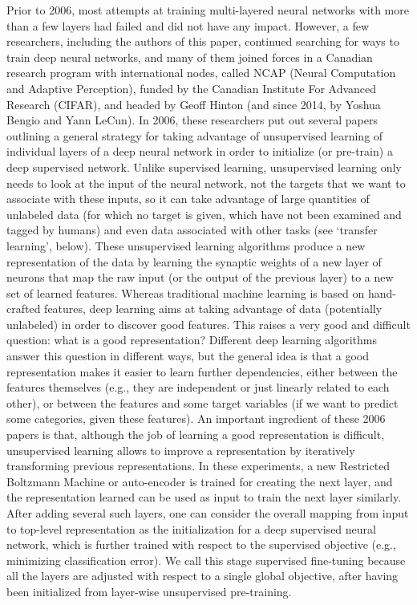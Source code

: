\documentclass[11pt]{article} %
\begin{document}
Prior to 2006, most attempts at training multi-layered neural networks with
more than a few layers had failed and did not have any impact. However, a
few researchers, including the authors of this paper, continued searching
for ways to train deep neural networks, and many of them joined forces in a
Canadian research program with international nodes, called NCAP (Neural
Computation and Adaptive Perception), funded by the Canadian Institute For
Advanced Research (CIFAR), and headed by Geoff Hinton (and since 2014, by
Yoshua Bengio and Yann LeCun). In 2006, these researchers put out several
papers~\citep{Hinton06, Bengio-nips-2006-small,ranzato-07-small} outlining a general strategy for taking advantage of
unsupervised learning of individual layers of a deep neural network in
order to initialize (or pre-train) a deep supervised network. Unlike
supervised learning, unsupervised learning only needs to look at the input
of the neural network, not the targets that we want to associate with these
inputs, so it can take advantage of large quantities of unlabeled data (for
which no target is given, which have not been examined and tagged by
humans) and even data associated with other tasks (see ‘transfer learning’,
below).  These unsupervised learning algorithms produce a new representation
of the data by learning the synaptic weights of a new layer of neurons that
map the raw input (or the output of the previous layer) to a new set of
learned features. Whereas traditional machine learning is based on
hand-crafted features, deep learning aims at taking advantage of data
(potentially unlabeled) in order to discover good features. This raises a
very good and difficult question: what is a good representation? Different
deep learning algorithms answer this question in different ways, but the
general idea is that a good representation makes it easier to learn further
dependencies, either between the features themselves (e.g., they are
independent or just linearly related to each other), or between the
features and some target variables (if we want to predict some categories,
given these features). An important ingredient of these 2006 papers is
that, although the job of learning a good representation is difficult,
unsupervised learning allows to improve a representation by iteratively
transforming previous representations. In these experiments, a new
Restricted Boltzmann Machine or auto-encoder is trained for creating the
next layer, and the representation learned can be used as input to train
the next layer similarly. After adding several such layers, one can
consider the overall mapping from input to top-level representation as the
initialization for a deep supervised neural network, which is further
trained with respect to the supervised objective (e.g., minimizing
classification error). We call this stage supervised fine-tuning because
all the layers are adjusted with respect to a single global objective,
after having been initialized from layer-wise unsupervised pre-training.
\end{document}
